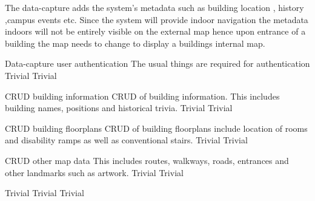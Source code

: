 The data-capture adds the system's metadata such as building location , history ,campus events etc. Since the system will provide indoor navigation the metadata indoors will not be entirely visible on the external map hence upon entrance of a building the map needs to change to display a buildings internal map.
\bigskip

\FuncReq
{Data-capture user authentication}
{The usual things are required for authentication}
{Trivial}
{Trivial}

\FuncReq
{CRUD building information}
{CRUD of building information. This includes building names, positions and historical trivia.}
{Trivial}
{Trivial}

\FuncReq
{CRUD building floorplans}
{CRUD of building floorplans include location of rooms and disability ramps as well as conventional stairs.}
{Trivial}
{Trivial}

\FuncReq
{CRUD other map data}
{This includes routes, walkways, roads, entrances and other landmarks such as artwork.}
{Trivial}
{Trivial}
 
{Trivial}
{Trivial}
{Trivial}

